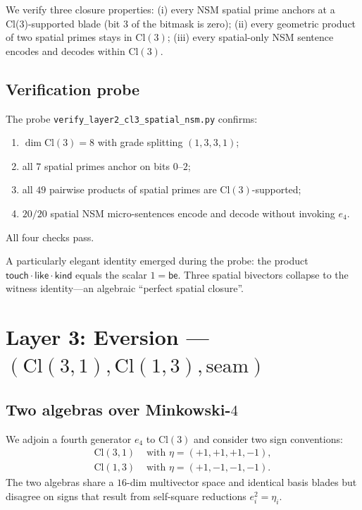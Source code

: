 \documentclass[11pt,a4paper]{article}
\theoremstyle{plain}
\theoremstyle{definition}
\theoremstyle{remark}
\numberwithin{equation}{section}
\providecommand{\Cl}{\mathrm{Cl}}
\begin{document}
We verify three closure properties: (i) every NSM spatial prime
anchors at a Cl(3)-supported blade (bit 3 of the bitmask is
zero); (ii) every geometric product of two spatial primes stays
in $\Cl(3)$; (iii) every spatial-only NSM sentence encodes and
decodes within $\Cl(3)$.

\subsection{Verification probe}

The probe \texttt{verify\_layer2\_cl3\_spatial\_nsm.py} confirms:
\begin{enumerate}[label=(\alph*)]
\item $\dim \Cl(3) = 8$ with grade splitting $(1, 3, 3, 1)$;
\item all $7$ spatial primes anchor on bits $0$--$2$;
\item all $49$ pairwise products of spatial primes are
      $\Cl(3)$-supported;
\item $20/20$ spatial NSM micro-sentences encode and decode
      without invoking $e_4$.
\end{enumerate}
All four checks pass.

A particularly elegant identity emerged during the probe: the
product $\mathsf{touch} \cdot \mathsf{like} \cdot \mathsf{kind}$
equals the scalar $1 = \mathsf{be}$.  Three spatial bivectors
collapse to the witness identity---an algebraic ``perfect spatial
closure''.


\section{Layer 3: Eversion --- $(\Cl(3,1), \Cl(1,3), \text{seam})$}\label{sec:layer3}

\subsection{Two algebras over Minkowski-$4$}

We adjoin a fourth generator $e_4$ to $\Cl(3)$ and consider two
sign conventions:
\begin{align*}
  \Cl(3,1) &\text{ with } \eta = (+1, +1, +1, -1), \\
  \Cl(1,3) &\text{ with } \eta = (+1, -1, -1, -1).
\end{align*}
The two algebras share a $16$-dim multivector space and identical
basis blades but disagree on signs that result from self-square
reductions $e_i^2 = \eta_i$.
\end{document}
